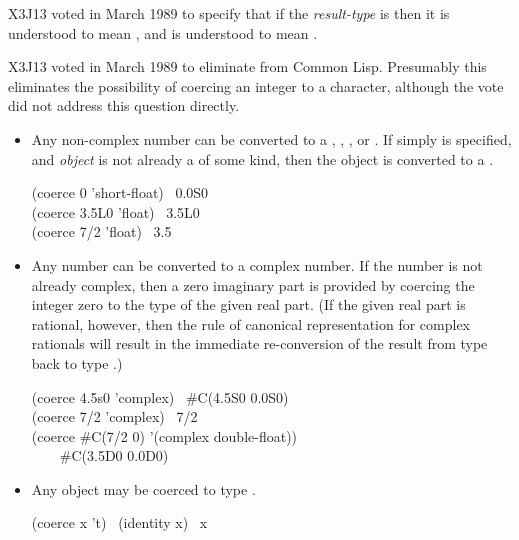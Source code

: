 \begin{defun}[Function]
\begin{newer}
X3J13 voted in March 1989 
to specify that if the \emph{result-type} is 
then it is understood to mean ,
and  is understood to mean .
\end{newer}

\begin{newer}
X3J13 voted in March 1989 
to eliminate  from Common Lisp.
Presumably this eliminates the possibility of coercing an
integer to a character, although the vote did not address
this question directly.
\end{newer}

\begin{itemize}
\item
Any non-complex number can be converted to a ,
, , or .  If simply 
is specified, and \emph{object} is not already a  of some kind, then
the object is converted to a .
\begin{lisp}
(coerce 0 'short-float) \EV\ 0.0S0 \\
(coerce 3.5L0 'float) \EV\ 3.5L0 \\
(coerce 7/2 'float) \EV\ 3.5
\end{lisp}

\item
Any number can be converted to a complex number.
If the number is not already complex, then a zero imaginary part
is provided by coercing the integer zero to the type of the given real part.
(If the given real part is rational, however, then the rule of
canonical representation for complex rationals will result
in the immediate re-conversion of the result from type 
back to type .)

\begin{lisp}
(coerce 4.5s0 'complex) \EV\ \#C(4.5S0 0.0S0) \\
(coerce 7/2 'complex) \EV\ 7/2 \\
(coerce \#C(7/2 0) '(complex double-float)) \\
~~~\EV\ \#C(3.5D0 0.0D0)
\end{lisp}

\item
Any object may be coerced to type .
\begin{lisp}
(coerce x 't) \EQ\ (identity x) \EQ\ x
\end{lisp}


\end{itemize}
\end{defun}
